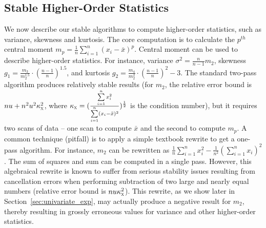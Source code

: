 \subsection{Stable Higher-Order Statistics}
\label{sec:highorder}

We now describe our stable algorithms to compute higher-order statistics, such as variance, skewness and kurtosis. The core computation is to calculate the $p^{th}$ central moment $m_p=\frac{1}{n}\sum\limits_{i=1}^{n}(x_i-\bar{x})^p$. Central moment can be used to describe higher-order statistics. For instance, variance $\sigma^2=\frac{n}{n-1}m_2$, skewness $g_1=\frac{m_3}{m_2^{1.5}}\cdot(\frac{n-1}{n})^{1.5}$, and kurtosis $g_2=\frac{m_4}{m_2^{2}}\cdot(\frac{n-1}{n})^{2}-3$. The standard two-pass algorithm produces relatively stable results (for $m_2$, the relative error bound is $nu+n^2u^2\kappa_\textsc{x} ^2$, where $\kappa_\textsc{x} = (\frac{\sum\limits_{i=1}^{n}x_i^2}{\sum\limits_{i=1}^{n}(x_i-\bar{x})^2})^{\frac{1}{2}}$ is the condition number), but it requires two scans of data -- one scan to compute $\bar{x}$ and the second to compute $m_p$. A common technique (pitfall) is to apply a simple textbook rewrite to get a one-pass algorithm. For instance, $m_2$ can be rewritten as $\frac{1}{n}\sum\limits_{i=1}^{n}x_i^2-\frac{1}{n^2}(\sum\limits_{i=1}^{n}x_i)^2$. The sum of squares and sum can be computed in a single pass. However, this algebraical rewrite is known to suffer from serious stability issues resulting from cancellation errors when performing subtraction of two large and nearly equal numbers (relative error bound is $nu\kappa_\textsc{x} ^2$). This rewrite, as we show later in Section~\ref{sec:univariate_exp}, may actually produce a negative result for $m_2$, thereby resulting in grossly erroneous values for variance and other higher-order statistics. 


